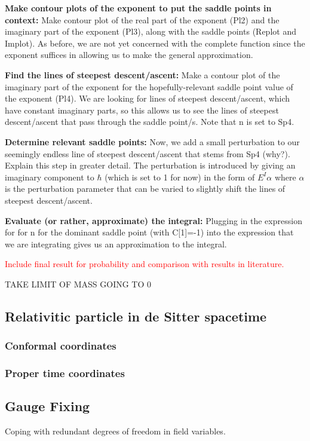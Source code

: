 \documentclass[12pt]{revtex4}
\newcommand{\red}{\textcolor{red}}
\begin{document}
\textbf{Make contour plots of the exponent to put the saddle points in context:}
Make contour plot of the real part of the exponent (Pl2) and the imaginary part of the exponent (Pl3), along with the saddle points (Replot and Implot). As before, we are not yet concerned with the complete function since the exponent suffices in allowing us to make the general approximation.

\textbf{Find the lines of steepest descent/ascent:}
Make a contour plot of the imaginary part of the exponent for the hopefully-relevant saddle point value of the exponent (Pl4). We are looking for lines of steepest descent/ascent, which have constant imaginary parts, so this allows us to see the lines of steepest descent/ascent that pass through the saddle point/s. Note that n is set to Sp4.

\textbf{Determine relevant saddle points:}
Now, we add a small perturbation to our seemingly endless line of steepest descent/ascent that stems from Sp4 (why?). Explain this step in greater detail. The perturbation is introduced by giving an imaginary component to $\hbar$ (which is set to 1 for now) in the form of $E^I\alpha$ where $\alpha$ is the perturbation parameter that can be varied to slightly shift the lines of steepest descent/ascent.

\textbf{Evaluate (or rather, approximate) the integral:}
Plugging in the expression for  for n for the dominant saddle point (with C[1]=-1) into the expression that we are integrating gives us an approximation to the integral.

\red{Include final result for probability and comparison with results in literature.}

TAKE LIMIT OF MASS GOING TO 0
\subsection{Relativitic particle in de Sitter spacetime}

\subsubsection{Conformal coordinates}


\subsubsection{Proper time coordinates}

\subsection{Gauge Fixing} \label{gauge}
Coping with redundant degrees of freedom in field variables.
\end{document}
